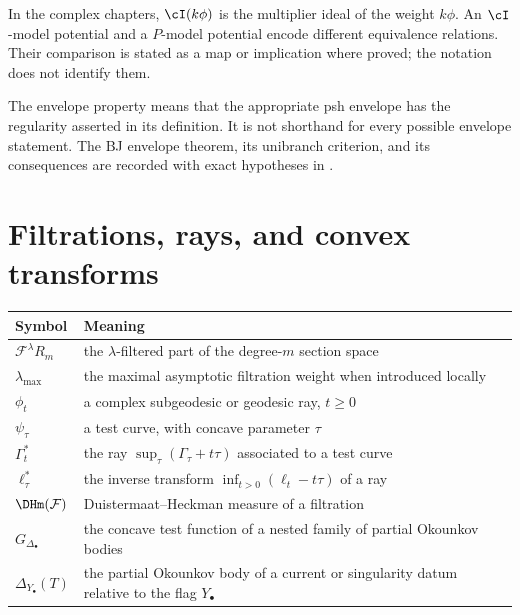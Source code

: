 In the complex chapters, \(\cI(k\phi)\) is the multiplier ideal of the
weight \(k\phi\).  An \(\cI\)-model potential and a \(P\)-model potential
encode different equivalence relations.  Their comparison is stated as a
map or implication where proved; the notation does not identify them.

The envelope property means that the appropriate psh envelope has the
regularity asserted in its definition.  It is not shorthand for every
possible envelope statement.  The BJ envelope theorem, its unibranch
criterion, and its consequences are recorded with exact hypotheses in
.

\section{Filtrations, rays, and convex transforms}
\label{sec:appK-rays}


\begin{center}
\begin{tabular}{@{}p{}p{}@{}}
\toprule
Symbol & Meaning \\
\midrule
\(\mathcal F^\lambda R_m\)
  & the \(\lambda\)-filtered part of the degree-\(m\) section space \\
\(\lambda_{\max}\)
  & the maximal asymptotic filtration weight when introduced locally \\
\(\phi_t\)
  & a complex subgeodesic or geodesic ray, \(t\geq0\) \\
\(\psi_\tau\)
  & a test curve, with concave parameter \(\tau\) \\
\(\Gamma_t^*\)
  & the ray \(\sup_\tau(\Gamma_\tau+t\tau)\) associated to a test curve \\
\(\ell_\tau^*\)
  & the inverse transform \(\inf_{t>0}(\ell_t-t\tau)\) of a ray \\
\(\DHm(\mathcal F)\)
  & Duistermaat--Heckman measure of a filtration \\
\(G_{\Delta_\bullet}\)
  & the concave test function of a nested family of partial Okounkov bodies \\
\(\Delta_{Y_\bullet}(T)\)
  & the partial Okounkov body of a current or singularity datum relative to
    the flag \(Y_\bullet\) \\
\bottomrule
\end{tabular}
\end{center}

